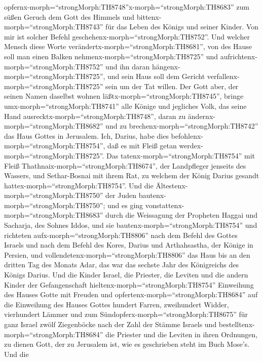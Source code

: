 opfernx-morph=``strongMorph:TH8748''x-morph=``strongMorph:TH8683'' zum
süßen Geruch dem Gott des Himmels und
bittenx-morph=``strongMorph:TH8743'' für das Leben des Königs und seiner
Kinder.  Von mir ist solcher Befehl
geschehenx-morph=``strongMorph:TH8752''. Und welcher Mensch diese Worte
verändertx-morph=``strongMorph:TH8681'', von des Hause soll man einen
Balken nehmenx-morph=``strongMorph:TH8725'' und
aufrichtenx-morph=``strongMorph:TH8752'' und ihn daran
hängenx-morph=``strongMorph:TH8725'', und sein Haus soll dem Gericht
verfallenx-morph=``strongMorph:TH8725'' sein um der Tat willen.
 Der Gott aber, der seinen Namen daselbst wohnen
läßtx-morph=``strongMorph:TH8745'', bringe
umx-morph=``strongMorph:TH8741'' alle Könige und jegliches Volk, das
seine Hand ausrecktx-morph=``strongMorph:TH8748'', daran zu
ändernx-morph=``strongMorph:TH8682'' und zu
brechenx-morph=``strongMorph:TH8742'' das Haus Gottes in Jerusalem. Ich,
Darius, habe dies befohlenx-morph=``strongMorph:TH8754'', daß es mit
Fleiß getan werdex-morph=``strongMorph:TH8725''.  Das
tatenx-morph=``strongMorph:TH8754'' mit Fleiß
Thathnai\textbar x-morph=``strongMorph:TH8674'', der Landpfleger
jenseits des Wassers, und Sethar-Bosnai mit ihrem Rat, zu welchem der
König Darius gesandt hattex-morph=``strongMorph:TH8754''. 
Und die Ältestenx-morph=``strongMorph:TH8750'' der Juden
bautenx-morph=``strongMorph:TH8750''; und es ging
vonstattenx-morph=``strongMorph:TH8683'' durch die Weissagung der
Propheten Haggai und Sacharja, des Sohnes Iddos, und sie
bautenx-morph=``strongMorph:TH8754'' und richteten
aufx-morph=``strongMorph:TH8806'' nach dem Befehl des Gottes Israels und
nach dem Befehl des Kores, Darius und Arthahsastha, der Könige in
Persien,  und vollendetenx-morph=``strongMorph:TH8806'' das
Haus bis an den dritten Tag des Monats Adar, das war das sechste Jahr
des Königreichs des Königs Darius.  Und die Kinder Israel,
die Priester, die Leviten und die andern Kinder der Gefangenschaft
hieltenx-morph=``strongMorph:TH8754'' Einweihung des Hauses Gotte mit
Freuden  und opfertenx-morph=``strongMorph:TH8684'' auf die
Einweihung des Hauses Gottes hundert Farren, zweihundert Widder,
vierhundert Lämmer und zum Sündopferx-morph=``strongMorph:TH8675'' für
ganz Israel zwölf Ziegenböcke nach der Zahl der Stämme Israels
 und bestelltenx-morph=``strongMorph:TH8684'' die Priester
und die Leviten in ihren Ordnungen, zu dienen Gott, der zu Jerusalem
ist, wie es geschrieben steht im Buch Mose's.  Und die
